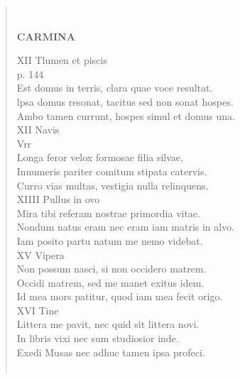 \documentclass[11pt, a4paper]{report}
\begin{document}
\begin{verse}
        ﻿\pagebreak 
     \marginpar{[226]} \begin{center} \textbf{CARMINA} \end{center}XII Tlumen et piscis \\ p. 144 \\ Est domus in terris, clara quae voce resultat. \\ lpsa domus resonat, tacitus sed non sonat hospes. \\ Ambo tamen currunt, hospes simul et domus una. \\ XII Navis \\ Vrr \\ Longa feror velox formosae filia silvae, \\ Innumeris pariter comitum stipata catervis. \\ Curro vias multas, vestigia nulla relinquens. \\ XIIII Pullus in ovo \\ Mira tibi referam nostrae primordia vitae. \\ Nondum natus eram nec eram iam matris in alvo. \\ Iam posito partu natum me nemo videbat. \\ XV Vipera \\ Non possum nasci, si non occidero matrem. \\ Occidi matrem, sed me manet exitus idem. \\ Id mea mors patitur, quod iam mea fecit origo. \\ XVI Tine \\ Littera me pavit, nec quid sit littera novi. \\ In libris vixi nec sum studiosior inde. \\ Exedi Musas nec adhuc tamen ipsa profeci. \\ 
        ﻿\pagebreak 

\end{verse}
\end{document}
